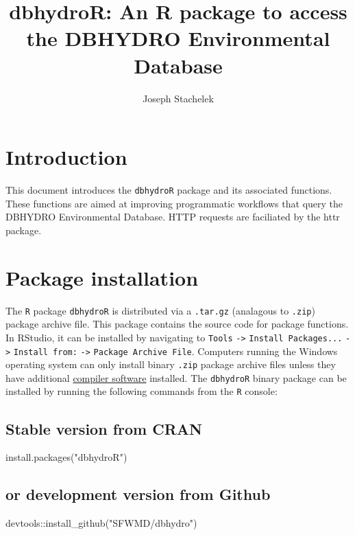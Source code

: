 \documentclass[12pt,notitlepage]{article}
\author{Joseph Stachelek}
\title{dbhydroR: An R package to access the DBHYDRO Environmental Database}
\begin{document}

\maketitle
 


\section{Introduction}

This document introduces the \texttt{dbhydroR} package and its associated functions. These functions are aimed at improving programmatic workflows that query the DBHYDRO Environmental Database. HTTP requests are faciliated by the httr \citep{httr} package. 

\section{Package installation}

The \texttt{R} package \texttt{dbhydroR} is distributed via a \texttt{.tar.gz} (analagous to \texttt{.zip}) package archive file. This package contains the source code for package functions. In RStudio, it can be installed by navigating to \texttt{Tools} \verb|->| \texttt{Install Packages...} \verb|->| \texttt{Install from:} \verb|->| \texttt{Package Archive File}. Computers running the Windows operating system can only install binary \texttt{.zip} package archive files unless they have additional \href{https://cran.r-project.org/bin/windows/Rtools/}{compiler software} installed. The \texttt{dbhydroR} binary package can be installed by running the following commands from the \texttt{R} console:

\vspace{10pt}

\subsection{Stable version from CRAN}
\begin{Schunk}
\begin{Sinput}
 install.packages("dbhydroR")
\end{Sinput}
\end{Schunk}

\subsection{or development version from Github}
\begin{Schunk}
\begin{Sinput}
 devtools::install_github("SFWMD/dbhydro")
\end{Sinput}
\end{Schunk}
\end{document}
